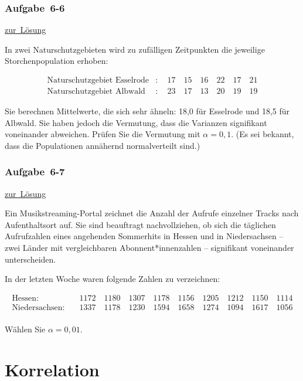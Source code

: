 \documentclass[
  11pt,
  ngerman,
  a4paper,
]{report}
\begin{document}
\hypertarget{aufgabe-6-6}{%
\subsection{Aufgabe~6-6}\label{aufgabe-6-6}}

\protect\hyperlink{loesung-6-6}{zur~Lösung}

In zwei Naturschutzgebieten wird zu zufälligen Zeitpunkten die jeweilige Storchenpopulation erhoben:

\[\begin{aligned}
\textrm{Naturschutzgebiet Esselrode}&: \quad17\quad15\quad16\quad22\quad17\quad21\\
\textrm{Naturschutzgebiet Albwald}&:\quad 23\quad17\quad13\quad20\quad19\quad19
\end{aligned}\]

Sie berechnen Mittelwerte, die sich sehr ähneln: 18,0 für Esselrode und 18,5 für Albwald. Sie haben jedoch die Vermutung, dass die Varianzen signifikant voneinander abweichen. Prüfen Sie die Vermutung mit \(\alpha=0{,}1\). (Es sei bekannt, dass die Populationen annähernd normalverteilt sind.)

\hypertarget{aufgabe-6-7}{%
\subsection{Aufgabe~6-7}\label{aufgabe-6-7}}

\protect\hyperlink{loesung-6-7}{zur~Lösung}

Ein Musikstreaming-Portal zeichnet die Anzahl der Aufrufe einzelner Tracks nach Aufenthaltsort auf. Sie sind beauftragt nachvollziehen, ob sich die täglichen Aufrufzahlen eines angehenden Sommerhits in Hessen und in Niedersachsen -- zwei Länder mit vergleichbaren Abonnent*innenzahlen -- signifikant voneinander unterscheiden.

In der letzten Woche waren folgende Zahlen zu verzeichnen:

\[\begin{aligned}
\textrm{Hessen}: & \quad 1172 \quad 1180 \quad 1307 \quad 1178 \quad 1156 \quad 1205 \quad 1212 \quad 1150 \quad 1114\\
\textrm{Niedersachsen}: & \quad 1337 \quad 1178 \quad 1230 \quad 1594 \quad 1658 \quad 1274 \quad 1094 \quad 1617 \quad 1056\\
\end{aligned}\]

Wählen Sie \(\alpha = 0{,}01\).

\hypertarget{korrelation}{%
\chapter{Korrelation}\label{korrelation}}
\end{document}

